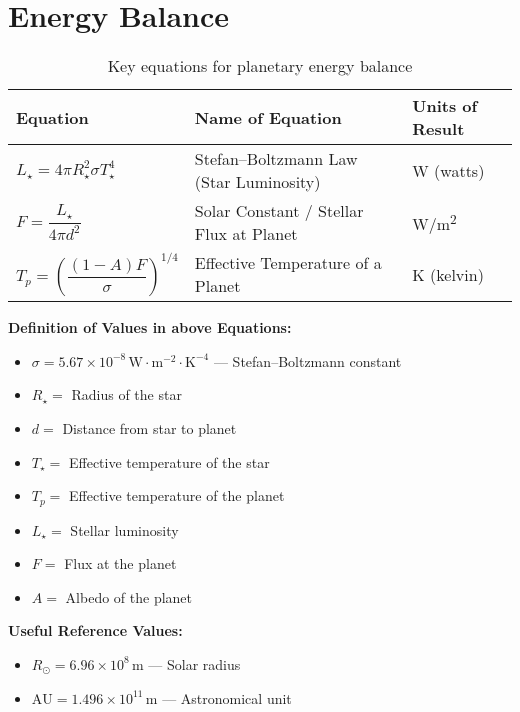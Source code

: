 \documentclass[12pt, a4paper]{article} %
\begin{document}
\section{Energy Balance}

\begin{table}[h!]
\centering
\begin{tabular}{|l|l|l|}
\hline
\textbf{Equation} & \textbf{Name of Equation} & \textbf{Units of Result} \\
\hline
$L_\star = 4\pi R_\star^2 \sigma T_\star^4$ & Stefan–Boltzmann Law (Star Luminosity) & W (watts) \\
\hline
$F = \dfrac{L_\star}{4\pi d^2}$ & Solar Constant / Stellar Flux at Planet & W/m\textsuperscript{2} \\[1ex]
\hline
$T_p = \left( \dfrac{(1 - A) F}{\sigma} \right)^{1/4}$ & Effective Temperature of a Planet & K (kelvin) \\
\hline
\end{tabular}
\caption{Key equations for planetary energy balance}
\end{table}

\textbf{Definition of Values in above Equations:}
\begin{itemize}[noitemsep, topsep=0pt]
    \item \( \sigma = 5.67 \times 10^{-8} \, \text{W} \cdot \text{m}^{-2} \cdot \text{K}^{-4} \) — Stefan–Boltzmann constant
    \item \( R_\star = \) Radius of the star
    \item \( d = \) Distance from star to planet
    \item \( T_\star = \) Effective temperature of the star
    \item \( T_p = \) Effective temperature of the planet
    \item \( L_\star = \) Stellar luminosity
    \item \( F = \) Flux at the planet
    \item \( A = \) Albedo of the planet
\end{itemize}

\textbf{Useful Reference Values:}
\begin{itemize}[noitemsep, topsep=0pt]
    \item \( R_\odot = 6.96 \times 10^8 \, \text{m} \) — Solar radius
    \item \( \text{AU} = 1.496 \times 10^{11} \, \text{m} \) — Astronomical unit
\end{itemize}
\end{document}
